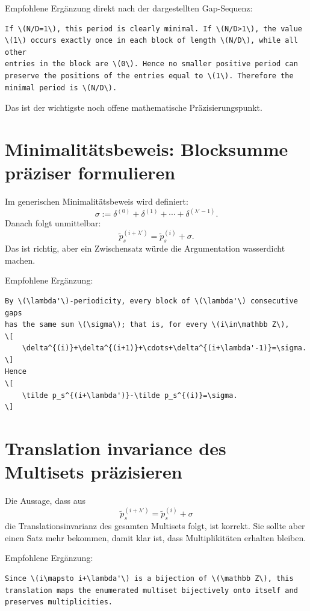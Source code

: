 \documentclass[11pt]{article}
\begin{document}
Empfohlene Ergänzung direkt nach der dargestellten Gap-Sequenz:

\begin{lstlisting}[language={[LaTeX]TeX}]
If \(N/D=1\), this period is clearly minimal. If \(N/D>1\), the value
\(1\) occurs exactly once in each block of length \(N/D\), while all other
entries in the block are \(0\). Hence no smaller positive period can
preserve the positions of the entries equal to \(1\). Therefore the
minimal period is \(N/D\).
\end{lstlisting}

Das ist der wichtigste noch offene mathematische Präzisierungspunkt.

\section{Minimalitätsbeweis: Blocksumme präziser formulieren}

Im generischen Minimalitätsbeweis wird definiert:
\[
    \sigma := \delta^{(0)}+\delta^{(1)}+\cdots+\delta^{(\lambda'-1)}.
\]
Danach folgt unmittelbar:
\[
    \tilde p_s^{(i+\lambda')} = \tilde p_s^{(i)} + \sigma.
\]
Das ist richtig, aber ein Zwischensatz würde die Argumentation wasserdicht machen.

Empfohlene Ergänzung:

\begin{lstlisting}[language={[LaTeX]TeX}]
By \(\lambda'\)-periodicity, every block of \(\lambda'\) consecutive gaps
has the same sum \(\sigma\); that is, for every \(i\in\mathbb Z\),
\[
    \delta^{(i)}+\delta^{(i+1)}+\cdots+\delta^{(i+\lambda'-1)}=\sigma.
\]
Hence
\[
    \tilde p_s^{(i+\lambda')}-\tilde p_s^{(i)}=\sigma.
\]
\end{lstlisting}

\section{Translation invariance des Multisets präzisieren}

Die Aussage, dass aus
\[
    \tilde p_s^{(i+\lambda')} = \tilde p_s^{(i)}+\sigma
\]
die Translationsinvarianz des gesamten Multisets folgt, ist korrekt. Sie sollte aber einen Satz mehr bekommen, damit klar ist, dass Multiplikitäten erhalten bleiben.

Empfohlene Ergänzung:

\begin{lstlisting}[language={[LaTeX]TeX}]
Since \(i\mapsto i+\lambda'\) is a bijection of \(\mathbb Z\), this
translation maps the enumerated multiset bijectively onto itself and
preserves multiplicities.
\end{lstlisting}
\end{document}
